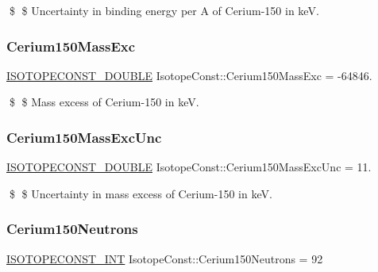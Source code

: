 \$ \$ Uncertainty in binding energy per A of Cerium-\/150 in keV. \mbox{\label{group___isotope_const-_cerium-_ce150_gaa1d74556e4cd7ab81f0f6e3ae9e58c56}} 
\subsubsection{\texorpdfstring{Cerium150\+Mass\+Exc}{Cerium150MassExc}}
{\footnotesize\ttfamily \mbox{\hyperlink{group___isotope_const-_macros_ga8f45a7272ce02c0b4c65c44636ed719a}{I\+S\+O\+T\+O\+P\+E\+C\+O\+N\+S\+T\+\_\+\+D\+O\+U\+B\+LE}} Isotope\+Const\+::\+Cerium150\+Mass\+Exc = -\/64846.}

\$ \$ Mass excess of Cerium-\/150 in keV. \mbox{\label{group___isotope_const-_cerium-_ce150_ga5c321db8014371d59313bb6b2cdecb7c}} 
\subsubsection{\texorpdfstring{Cerium150\+Mass\+Exc\+Unc}{Cerium150MassExcUnc}}
{\footnotesize\ttfamily \mbox{\hyperlink{group___isotope_const-_macros_ga8f45a7272ce02c0b4c65c44636ed719a}{I\+S\+O\+T\+O\+P\+E\+C\+O\+N\+S\+T\+\_\+\+D\+O\+U\+B\+LE}} Isotope\+Const\+::\+Cerium150\+Mass\+Exc\+Unc = 11.}

\$ \$ Uncertainty in mass excess of Cerium-\/150 in keV. \mbox{\label{group___isotope_const-_cerium-_ce150_gacd2351115b0703b6cbfe7d288c8bd288}} 
\subsubsection{\texorpdfstring{Cerium150\+Neutrons}{Cerium150Neutrons}}
{\footnotesize\ttfamily \mbox{\hyperlink{group___isotope_const-_macros_ga5f18360b3e99483a35c32d789e62621c}{I\+S\+O\+T\+O\+P\+E\+C\+O\+N\+S\+T\+\_\+\+I\+NT}} Isotope\+Const\+::\+Cerium150\+Neutrons = 92}

